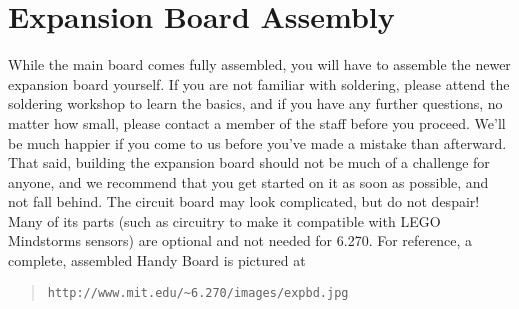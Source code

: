 \chapter{Expansion Board Assembly}
\label{expboard}

While the main board comes fully assembled, you will have to assemble
the newer expansion board yourself.  If you are not familiar with soldering,
please attend the soldering workshop to learn the basics, and if you
have any further questions, no matter how small, please contact a
member of the staff before you proceed.  We'll be much happier if you
come to us before you've made a mistake than afterward.  That said,
building the expansion board should not be much of a challenge for
anyone, and we recommend that you get started on it as soon as
possible, and not fall behind.  The circuit board may look
complicated, but do not despair!  Many of its parts (such as circuitry
to make it compatible with LEGO Mindstorms sensors) are optional and
not needed for 6.270.  For reference, a complete, assembled Handy
Board is pictured at
\begin{quote}
\begin{verbatim}
http://www.mit.edu/~6.270/images/expbd.jpg
\end{verbatim}
\end{quote}
